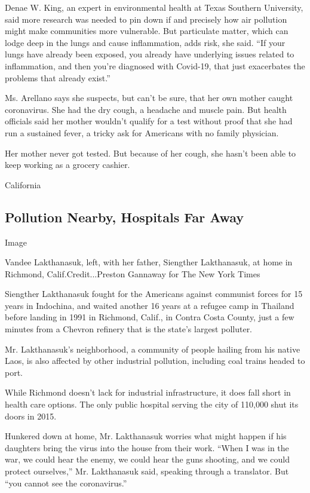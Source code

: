 Denae W. King, an expert in environmental health at Texas Southern
University, said more research was needed to pin down if and precisely
how air pollution might make communities more vulnerable. But
particulate matter, which can lodge deep in the lungs and cause
inflammation, adds risk, she said. ``If your lungs have already been
exposed, you already have underlying issues related to inflammation, and
then you're diagnosed with Covid-19, that just exacerbates the problems
that already exist.''

Ms. Arellano says she suspects, but can't be sure, that her own mother
caught coronavirus. She had the dry cough, a headache and muscle pain.
But health officials said her mother wouldn't qualify for a test without
proof that she had run a sustained fever, a tricky ask for Americans
with no family physician.

Her mother never got tested. But because of her cough, she hasn't been
able to keep working as a grocery cashier.

California

\hypertarget{pollution-nearby-hospitals-far-away}{%
\subsection{Pollution Nearby, Hospitals Far
Away}\label{pollution-nearby-hospitals-far-away}}

Image

Vandee Lakthanasuk, left, with her father, Siengther Lakthanasuk, at
home in Richmond, Calif.Credit...Preston Gannaway for The New York Times

Siengther Lakthanasuk fought for the Americans against communist forces
for 15 years in Indochina, and waited another 16 years at a refugee camp
in Thailand before landing in 1991 in Richmond, Calif., in Contra Costa
County, just a few minutes from a Chevron refinery that is the state's
largest polluter.

Mr. Lakthanasuk's neighborhood, a community of people hailing from his
native Laos, is also affected by other industrial pollution, including
coal trains headed to port.

While Richmond doesn't lack for industrial infrastructure, it does fall
short in health care options. The only public hospital serving the city
of 110,000 shut its doors in 2015.

Hunkered down at home, Mr. Lakthanasuk worries what might happen if his
daughters bring the virus into the house from their work. ``When I was
in the war, we could hear the enemy, we could hear the guns shooting,
and we could protect ourselves,'' Mr. Lakthanasuk said, speaking through
a translator. But ``you cannot see the coronavirus.''

